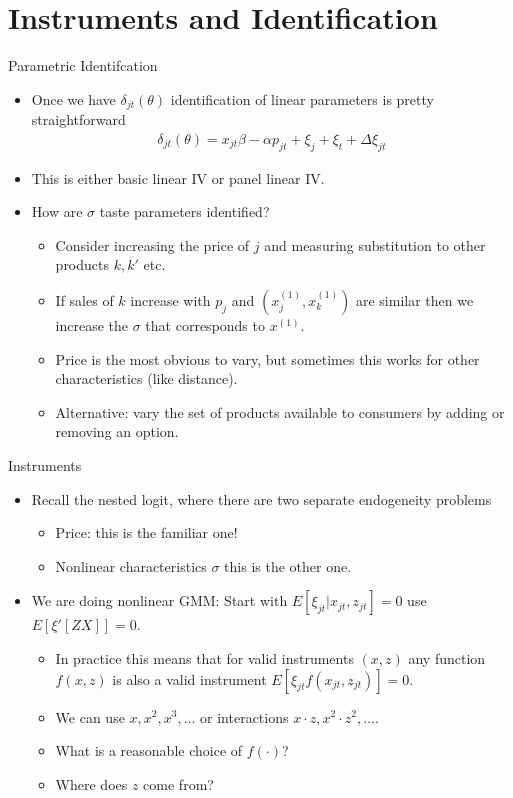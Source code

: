 \documentclass[aspectratio=169,11pt]{beamer}
\begin{document}
\section{Instruments and Identification}
\begin{frame}{Parametric Identifcation}
\begin{itemize}
\item Once we have $\delta_{jt}(\theta)$ identification of linear parameters is pretty straightforward
\begin{eqnarray*}
\delta_{jt}(\theta) = x_{jt} \beta - \alpha p_{jt} + \xi_j + \xi_t + \Delta \xi_{jt}
\end{eqnarray*}
\item This is either basic linear IV or panel linear IV.
\item How are $\sigma$ taste parameters identified?
\begin{itemize}
\item Consider increasing the price of $j$ and measuring substitution to other products $k,k'$ etc.
\item If sales of $k$ increase with $p_j$ and $(x_j^{(1)},x_k^{(1)})$ are similar then we increase the $\sigma$ that corresponds to $x^{(1)}$.
\item Price is the most obvious to vary, but sometimes this works for other characteristics (like distance).
\item Alternative: vary the set of products available to consumers by adding or removing an option.
\end{itemize}
\end{itemize}
\end{frame}




\begin{frame}{Instruments}
\begin{itemize}
\item Recall the nested logit, where there are two separate endogeneity problems
\begin{itemize}
\item \alert{Price}: this is the familiar one!
\item \alert{Nonlinear characteristics} $\sigma$ this is the other one.
\end{itemize}
\item We are doing nonlinear GMM: Start with $E[\xi_{jt} | x_{jt}, z_{jt}]=0$ use $E[\xi' [Z X]]=0$.
\begin{itemize}
\item In practice this means that for valid instruments $(x,z)$ any function $f(x,z)$ is also a valid instrument $E[ \xi_{jt} f(x_{jt},z_{jt})]=0$.
\item We can use $x, x^2, x^3,\ldots$ or interactions $x \cdot z, x^2 \cdot z^2, \ldots$.
\item What is a reasonable choice of $f(\cdot)$?
\item Where does $z$ come from?
\end{itemize}
\end{itemize}
\end{frame}
\end{document}
